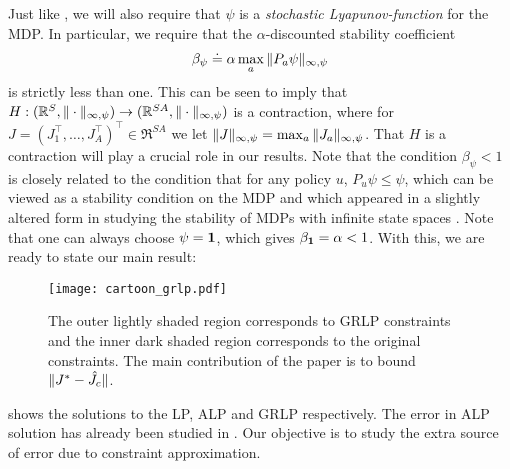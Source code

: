 \documentclass[twocolumn]{IEEEtran}
\begin{document}
Just like \citet{ALP}, we will also require that $\psi$ is a \emph{stochastic Lyapunov-function} for the MDP.  In particular, we require that the $\alpha$-discounted stability coefficient
\begin{align} \label{eq:betadef}
\beta_\psi \doteq \alpha  \max_{a} \norm{P_a \psi}_{\infty,\psi}
\end{align}
is strictly less than one.
This can be seen to imply that $H: (\mathbb{R}^S,\|\cdot\|_{\infty,\psi}) \to (\mathbb{R}^{SA}, \|\cdot\|_{\infty,\psi})$ is a contraction,
where for $J = (J_1^\top,\dots,J_A^\top)^\top \in \Re^{SA}$ we let $\|J\|_{\infty,\psi} = \max_a\|J_a\|_{\infty,\psi}$.
That $H$ is a contraction will play a crucial role in our results.
Note that the condition $\beta_\psi<1$ is closely related to the condition that for any policy $u$, 
$P_u \psi \le \psi$, which can be viewed as a stability condition on the MDP 
and which appeared in a slightly altered form in studying the stability of MDPs with infinite 
state spaces \citep[e.g.,][]{chemey99a}.
Note that one can always choose $\psi = \mathbf{1}$, which gives $\beta_{\mathbf{1}} = \alpha<1$. 
With this, we are ready to state our main result:


\FloatBarrier
%
\begin{figure}
\texttt{[image: cartoon\_grlp.pdf]}
\caption{
The outer lightly shaded region corresponds to GRLP constraints and the inner dark shaded region corresponds to the original constraints. The main contribution of the paper is to bound $\|J^*-\hat{J}_c\|$.}
\label{cartoon}
\end{figure}
 shows the solutions to the LP, ALP and GRLP respectively. The error in ALP solution has already been studied in \cite{ALP}. Our objective is to study the extra source of error due to constraint approximation.
\fi
\end{document}
